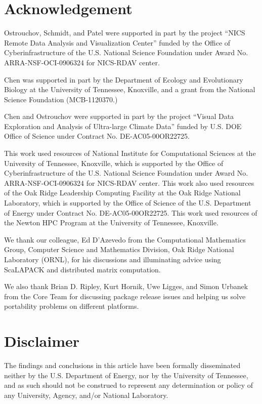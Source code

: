 \section*{Acknowledgement}

Ostrouchov, Schmidt, and Patel were supported in part by the project
``NICS Remote Data Analysis and Visualization Center''
funded by the Office of Cyberinfrastructure of the
U.S. National Science Foundation
under Award No. ARRA-NSF-OCI-0906324 for NICS-RDAV center.

Chen was supported in part by
the Department of Ecology and Evolutionary Biology at the
University of Tennessee, Knoxville, and a grant from
the National Science Foundation (MCB-1120370.)

Chen and Ostrouchov were supported in part by the project
``Visual Data Exploration and Analysis of Ultra-large Climate Data''
funded by U.S. DOE Office of Science
under Contract No. DE-AC05-00OR22725.

This work used resources of National Institute for Computational
Sciences at the University of Tennessee, Knoxville, which is supported
by the Office of Cyberinfrastructure of the U.S. National Science Foundation
under Award No. ARRA-NSF-OCI-0906324 for NICS-RDAV center.
This work also used resources of the Oak Ridge Leadership Computing Facility
at the Oak Ridge National Laboratory, which is supported by the Office of
Science of the U.S. Department of Energy under Contract No. DE-AC05-00OR22725.
This work used resources of the Newton HPC Program at the University of Tennessee, 
Knoxville. 

We thank our colleague, Ed D'Azevedo
from the Computational Mathematics Group,
Computer Science and Mathematics Division,
Oak Ridge National Laboratory (ORNL),
for his discussions and illuminating advice using 
ScaLAPACK and distributed matrix computation.

We also thank Brian D. Ripley, Kurt Hornik, Uwe Ligges, and Simon Urbanek
from the  Core Team for discussing package release issues and
helping us solve portability problems on different platforms.

\section*{Disclaimer}

The findings and conclusions in this article have been formally disseminated
neither by the U.S. Department of Energy, nor by the University of Tennessee,
and as such should not be construed to represent any determination or policy of
any University, Agency, and/or National Laboratory.
